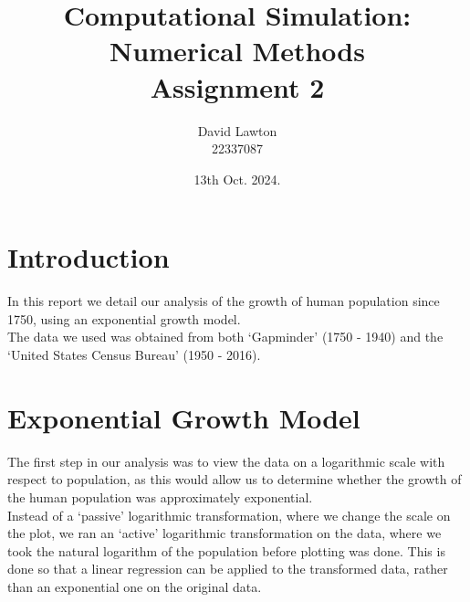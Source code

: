 \documentclass{article}
\title{Computational Simulation: Numerical Methods\\Assignment 2}
\author{David Lawton\\22337087}
\date{13th Oct. 2024.}
\theoremstyle{definition}
\theoremstyle{remark}
\begin{document}
\maketitle

\tableofcontents

\section{Introduction}
In this report we detail our analysis of the growth of human population since 1750, using an exponential growth model.\\
\indent The data we used was obtained from both `Gapminder' (1750 - 1940) and the `United States Census Bureau' (1950 - 2016).\\

\section{Exponential Growth Model}
The first step in our analysis was to view the data on a logarithmic scale with respect to population, as this would allow us to determine whether the growth of the human population was approximately exponential.\\
\indent Instead of a `passive' logarithmic transformation, where we change the scale on the plot, we ran an `active' logarithmic transformation on the data, where we took the natural logarithm of the population before plotting was done. This is done so that a linear regression can be applied to the transformed data, rather than an exponential one on the original data.\\
\end{document}
